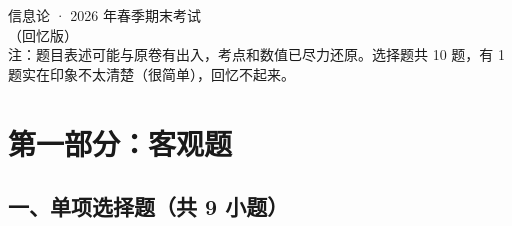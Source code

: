 \documentclass[12pt,a4paper]{ctexart}
\begin{document}
\begin{center}
{\Huge\heiti 信息论 · 2026 年春季期末考试}\\[3mm]
{\Large\heiti （回忆版）}\\[2mm]
{\small 注：题目表述可能与原卷有出入，考点和数值已尽力还原。选择题共 10 题，有 1 题实在印象不太清楚（很简单），回忆不起来。}
\end{center}

\vspace{4mm}

\section*{第一部分：客观题}

\vspace{-6mm}

\subsection*{一、单项选择题（共 9 小题）}
\end{document}
